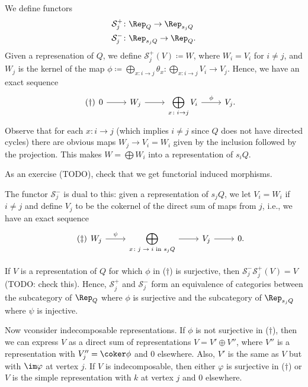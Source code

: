 We define functors
\begin{align*}
	\mathcal{S}^+_j &\colon \Rep_Q \to \Rep_{s_jQ}\\
	\mathcal{S}^-_j &\colon \Rep_{s_jQ}\to \Rep_Q.
\end{align*}
Given a represenation of $Q$, we define $\mathcal{S}_j^+(V)\coloneqq W$, where
$W_i = V_i$ for $i\neq j$, and $W_j$ is the kernel of the map
$\phi\coloneqq \bigoplus_{x\colon i\to j}\theta_x\colon \bigoplus_{x\colon i\to j} V_i \to V_j$.
Hence, we have an exact sequence
\begin{equation}\tag{$\dagger$}
	\begin{tikzcd}
		0\ar[r] & W_j\ar[r] & \displaystyle\bigoplus_{x\colon i\to j} V_i\ar[r, "\phi"] & V_j.
	\end{tikzcd}
\end{equation}
Observe that for each $x\colon i\to j$ (which implies $i\neq j$ since $Q$ does
not have directed cycles)
there are obvious maps $W_j \to V_i = W_i$ given by the inclusion followed
by the projection. This makes $W = \bigoplus W_i$ into a representation
of $s_iQ$.

As an exercise (TODO), check that we get functorial induced morphisms.

The functor $\mathcal{S}_j^-$ is dual to this: given a representation of $s_jQ$,
we let $V_i = W_i$ if $i\neq j$ and define $V_j$ to be the cokernel of the direct
sum of maps from $j$, i.e., we have an exact sequence
\begin{equation}\tag{$\ddagger$}
	\begin{tikzcd}
		W_j \ar[r, "\psi"] & \displaystyle\bigoplus_{\text{$x\colon j\to i$ in $s_jQ$}}\ar[r] & V_j\ar[r] & 0.
	\end{tikzcd}
\end{equation}

If $V$ is a representation of $Q$ for which $\phi$ in  ($\dagger$) is surjective, then
$\mathcal{S}_j^-\mathcal{S}_j^+(V) = V$ (TODO: check this). Hence,
$\mathcal{S}_j^+$ and $\mathcal{S}_j^-$ form an equivalence of categories between
the subcategory of $\Rep_Q$ where $\phi$ is surjective and the subcategory of
$\Rep_{s_jQ}$ where $\psi$ is injective.

Now vconsider indecomposable representations. If $\phi$ is not surjective in
($\dagger$), then we can express $V$ as a direct sum of representations
$V = V'\oplus V''$, where $V''$ is a representation with  $V''_j = \coker \phi$
and $0$ elsewhere. Also, $V'$ is the same as $V$ but with $\im \varphi$
at vertex $j$. If $V$ is indecomposable, then either $\varphi$ is surjective
in ($\dagger$) or $V$ is the simple representation with $k$ at vertex $j$ and
$0$ elsewhere.
